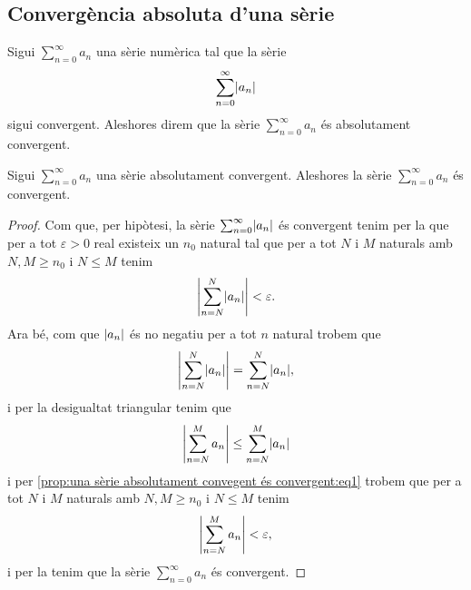 \documentclass[../Apunts.tex]{subfiles}
\begin{document}
	\subsection{Convergència absoluta d'una sèrie}
	\begin{definition}
		\label{def:convergència absoluta d'una sèrie}
		Sigui \(\sum_{n=0}^{\infty}a_{n}\) una sèrie numèrica tal que la sèrie
		\[\sum_{n=0}^{\infty}\abs{a_{n}}\]
		sigui convergent. Aleshores direm que la sèrie \(\sum_{n=0}^{\infty}a_{n}\) és absolutament convergent.
	\end{definition}
	\begin{proposition}
		\label{prop:una sèrie absolutament convergent és convergent}
		Sigui \(\sum_{n=0}^{\infty}a_{n}\) una sèrie absolutament convergent. Aleshores la sèrie \(\sum_{n=0}^{\infty}a_{n}\) és convergent.
		\begin{proof}
			Com que, per hipòtesi, la sèrie \(\sum_{n=0}^{\infty}\abs{a_{n}}\) és convergent tenim per la  que per a tot \(\varepsilon>0\) real existeix un \(n_{0}\) natural tal que per a tot \(N\) i \(M\) naturals amb \(N,M\geq n_{0}\) i \(N\leq M\) tenim
			\begin{equation}
				\label{prop:una sèrie absolutament convegent és convergent:eq1}
				\abs{\sum_{n=N}^{N}\abs{a_{n}}}<\varepsilon.
			\end{equation}
			Ara bé, com que \(\abs{a_{n}}\) és no negatiu per a tot \(n\) natural trobem que
			\[\abs{\sum_{n=N}^{N}\abs{a_{n}}}=\sum_{n=N}^{N}\abs{a_{n}},\]
			i per la desigualtat triangular %
			tenim que
			\[\abs{\sum_{n=N}^{M}a_{n}}\leq\sum_{n=N}^{M}\abs{a_{n}}\]
			i per \eqref{prop:una sèrie absolutament convegent és convergent:eq1} trobem que per a tot \(N\) i \(M\) naturals amb \(N,M\geq n_{0}\) i \(N\leq M\) tenim
			\[\abs{\sum_{n=N}^{M}a_{n}}<\varepsilon,\]
			i per la  tenim que la sèrie \(\sum_{n=0}^{\infty}a_{n}\) és convergent.
		\end{proof}
	\end{proposition}
\end{document}

